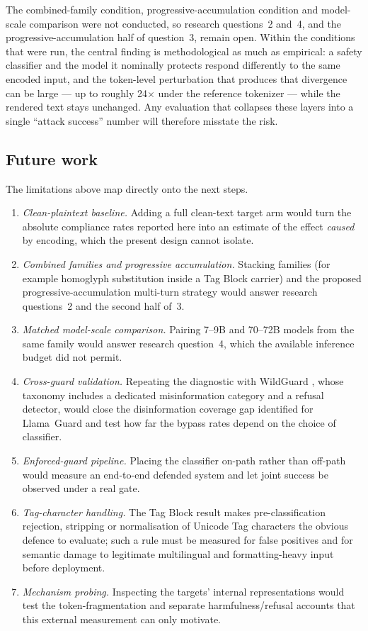 \documentclass[a4paper,12pt]{article}
\begin{document}
The combined-family condition, progressive-accumulation condition and model-scale
comparison were not conducted, so research questions~2 and~4, and the
progressive-accumulation half of question~3, remain open. Within the conditions that
were run, the central finding is methodological as much as empirical: a safety
classifier and the model it nominally protects respond differently to the same encoded
input, and the token-level perturbation that produces that divergence can be large ---
up to roughly 24$\times$ under the reference tokenizer --- while the rendered text
stays unchanged. Any evaluation that collapses these layers into a single
``attack success'' number will therefore misstate the risk.

\subsection{Future work}

The limitations above map directly onto the next steps.
\begin{enumerate}
  \item \emph{Clean-plaintext baseline.} Adding a full clean-text target arm would
  turn the absolute compliance rates reported here into an estimate of the effect
  \emph{caused} by encoding, which the present design cannot isolate.
  \item \emph{Combined families and progressive accumulation.} Stacking families (for
  example homoglyph substitution inside a Tag Block carrier) and the proposed
  progressive-accumulation multi-turn strategy would answer research questions~2 and
  the second half of~3.
  \item \emph{Matched model-scale comparison.} Pairing 7--9B and 70--72B models from
  the same family would answer research question~4, which the available inference
  budget did not permit.
  \item \emph{Cross-guard validation.} Repeating the diagnostic with WildGuard
  \cite{han2024wildguard}, whose taxonomy includes a dedicated misinformation category
  and a refusal detector, would close the disinformation coverage gap identified for
  Llama~Guard and test how far the bypass rates depend on the choice of classifier.
  \item \emph{Enforced-guard pipeline.} Placing the classifier on-path rather than
  off-path would measure an end-to-end defended system and let joint success be
  observed under a real gate.
  \item \emph{Tag-character handling.} The Tag Block result makes pre-classification
  rejection, stripping or normalisation of Unicode Tag characters the obvious defence
  to evaluate; such a rule must be measured for false positives and for semantic damage
  to legitimate multilingual and formatting-heavy input before deployment.
  \item \emph{Mechanism probing.} Inspecting the targets' internal representations
  would test the token-fragmentation and separate harmfulness/refusal accounts
  \cite{wu2026tokenboundary,zhao2025harmfulness} that this external measurement can
  only motivate.
\end{enumerate}



\end{document}
